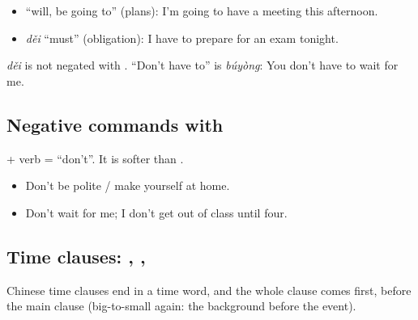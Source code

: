 \begin{itemize}
  \item {} ``will, be going to'' (plans):  I'm going to have a
        meeting this afternoon.
  \item {} \emph{děi} ``must'' (obligation):  I have to
        prepare for an exam tonight.
\end{itemize}

\begin{important}[Negating \zh{得}]
 \emph{děi} is not negated with . ``Don't have to'' is 
\emph{búyòng}:  You don't have to wait for me.
\end{important}

\subsection{Negative commands with }

 + verb = ``don't''. It is softer than .
\begin{itemize}
  \item {} Don't be polite / make yourself at home.
  \item {} Don't wait for me; I don't get out of class until four.
\end{itemize}

\subsection{Time clauses: , , }

Chinese time clauses end in a time word, and the whole clause comes first, before the
main clause (big-to-small again: the background before the event).

\begin{center}
\end{center}

